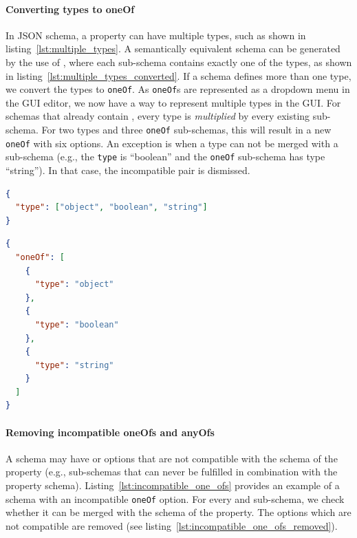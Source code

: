 \paragraph{Converting types to oneOf}
In JSON schema, a property can have multiple types, such as shown in listing~\ref{lst:multiple_types}.
A semantically equivalent schema can be generated by the use of , where each sub-schema contains exactly one of the types,
as shown in listing~\ref{lst:multiple_types_converted}.
If a schema defines more than one type, we convert the types to \texttt{oneOf}.
As \texttt{oneOf}s are represented as a dropdown menu in the GUI editor, we now have a way to represent multiple types in the GUI\@.
For schemas that already contain , every type is \textit{multiplied} by every existing  sub-schema.
For two types and three \texttt{oneOf} sub-schemas, this will result in a new \texttt{oneOf} with six options.
An exception is when a type can not be merged with a  sub-schema (e.g., the \texttt{type} is ``boolean'' and the \texttt{oneOf} sub-schema has type ``string'').
In that case, the incompatible pair is dismissed.

\begin{lstlisting}[language=json, firstnumber=1, caption=
    {Simple JSON schema with three possible types}, captionpos=b, label={lst:multiple_types}]
{
  "type": ["object", "boolean", "string"]
}
\end{lstlisting}

\begin{lstlisting}[language=json, firstnumber=1, caption=
    {Simple JSON schema after conversion of types to oneOf}, captionpos=b,label={lst:multiple_types_converted}]
{
  "oneOf": [
    {
      "type": "object"
    },
    {
      "type": "boolean"
    },
    {
      "type": "string"
    }
  ]
}
\end{lstlisting}


\paragraph{Removing incompatible oneOfs and anyOfs}
A schema may have  or  options that are not compatible with the schema of the property
(e.g., sub-schemas that can never be fulfilled in combination with the property schema).
Listing~\ref{lst:incompatible_one_ofs} provides an example of a schema with an incompatible \texttt{oneOf} option.
For every  and  sub-schema, we check whether it can be merged with the schema of the property.
The options which are not compatible are removed (see listing~\ref{lst:incompatible_one_ofs_removed}).

